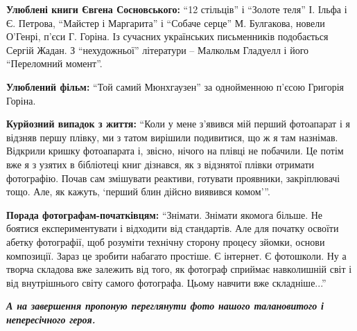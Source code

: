 \textbf{Улюблені книги Євгена Сосновського:} \enquote{12 стільців} і \enquote{Золоте теля} І.
Ільфа і Є.  Петрова, \enquote{Майстер і Маргарита} і \enquote{Собаче серце} М. Булгакова,
новели О'Генрі, п'єси Г. Горіна. Із сучасних українських письменників
подобається Сергій Жадан.  З \enquote{нехудожньої} літератури – Малкольм Гладуелл і
його \enquote{Переломний момент}.

\textbf{Улюблений фільм:} \enquote{Той самий Мюнхгаузен} за однойменною п'єсою Григорія
Горіна.

\textbf{Курйозний випадок з життя:} \enquote{Коли у мене з'явився мій перший фотоапарат
і я відзняв першу плівку, ми з татом вирішили подивитися, що ж я там назнімав.
Відкрили кришку фотоапарата і, звісно, нічого на плівці не побачили. Це потім
вже я з узятих в бібліотеці книг дізнався, як з відзнятої плівки отримати
фотографію. Почав сам змішувати реактиви, готувати проявники, закріплювачі
тощо. Але, як кажуть, \enquote{перший блин дійсно виявився комом}}.

\textbf{Порада фотографам-початківцям:} \enquote{Знімати. Знімати якомога більше. Не
боятися експериментувати і відходити від стандартів. Але для початку освоїти
абетку фотографії, щоб розуміти технічну сторону процесу зйомки, основи
композиції.  Зараз це зробити набагато простіше. Є інтернет. Є фотошколи. Ну а
творча складова вже залежить від того, як фотограф сприймає навколишній світ і
від внутрішнього світу самого фотографа. Цьому навчити вже складніше...}

\begin{center}
\color{blue}\em\textbf{А на завершення пропоную переглянути фото нашого талановитого і непересічного героя.}
\end{center}


